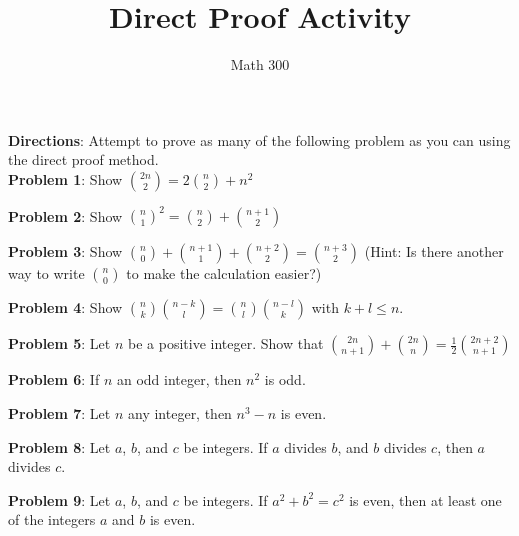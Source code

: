 \documentclass[11pt]{amsart}
\title{Direct Proof Activity}
\author{Math 300}
\begin{document}
\maketitle


{\bf Directions}: Attempt to prove as many of the following problem as you can using the direct proof method.\\


{\bf Problem 1}: Show $\binom{2n}{2}=2\binom{n}{2}+n^2$ \vspace{.25cm}

{\bf Problem 2}: Show $\binom{n}{1} ^2=\binom{n}{2}+ \binom{n+1}{2}$

{\bf Problem 3}: Show $\binom{n}{0}+\binom{n+1}{1}+\binom{n+2}{2} =\binom{n+3}{2}$ (Hint: Is there another way to write $\binom{n}{0}$ to make the calculation easier?)\vspace{.25cm}

{\bf Problem 4}: Show
$\binom{n}{k}\binom{n-k}{l}=\binom{n}{l}\binom{n-l}{k}$ with $k+l \leq n$.
\vspace{.25cm}

{\bf Problem 5}:
Let $n$ be a positive integer.  Show that $\binom{2n}{n+1}+\binom{2n}{n}=\frac{1}{2}\binom{2n+2}{n+1}$
\vspace{.25cm}

{\bf Problem 6}:
If $n$ an odd integer, then $n^2$ is odd.\vspace{.25cm}

{\bf Problem 7}:
Let $n$ any integer, then $n^3-n$ is even.\vspace{.25cm}

{\bf Problem 8}:
Let $a$, $b$, and $c$ be integers. If $a$ divides $b$, and $b$ divides $c$, then $a$ divides $c$.\vspace{.25cm}

{\bf Problem 9}:
Let $a$, $b$, and $c$ be integers. If $a^2+b^2=c^2$ is even, then at least one of the integers $a$ and $b$ is even.\vspace{.25cm}
\end{document}

